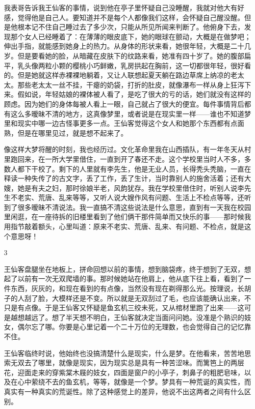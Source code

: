 我表哥告诉我王仙客的事情，说到他在亭子里怀疑自己没睡醒，我就对他大有好感，觉得他是自己人。要知道并不是每个人都像我们这样，会怀疑自己醒没醒。但是他根本记不住自己睡过去了多少次，只能从所见所闻来判断了。他俯身下去，发现那个女人已经睡着了：在薄薄的眼皮底下，她的眼球在颤动，大概是在做梦吧；伸出手指，就能感到她身上的热力。从身体的形状来看，她很年轻，大概是二十几岁。但是要看她的脸，从暗藏在皮肤下的纹路来看，她准有四十岁了。她的腹部扁平，乳头像两粒小颗的樱桃小巧鲜嫩，乳房拱起在胸前，这一切都很年轻，很好看的。但是她就这样赤裸裸地躺着，又让人联想起夏天躺在路边草席上纳凉的老太太。那些老太太一丝不挂，干瘪的奶袋，打折的肚皮，就像瀑布一样从身上狂泻下来。假如说，年轻姑娘的裸体被人看了，是吃了很大的亏的话，她们就没有这样的顾虑。因为她们的身体每被人看上一眼，自己就占了很大的便宜。每件事情背后都有这么多暧昧不清的地方，这真像梦里，或者说是在现实里一样——谁也不知道梦里和现实中哪一边古怪事更多一点。王仙客觉得这个女人和她那个东西都有点面熟，但是在哪里见过，就是想不起来了。 

像这样大梦将醒的时刻，我也经历过。文化革命里我在山西插队，有一年冬天从村里跑回来，在一所大学里借住，一直到开了春还不走。这个学校里当时人不多，多数人都下干校了。剩下的人里就有李先生，他是无业人员，长得秃头秃脑，一直在释读一种失传了的古文字，丢了工作，丢了生计，当时靠别人的施舍活着；还有大嫂，她是有夫之妇，那时徐娘半老，风韵犹存。我在学校里借住时，听别人说李先生不老实、荒唐、乱来等等，又听人说大嫂作风有问题、生活上不检点等等，还听到了很多暧昧不清说法。我一直搞不清这些说法是什么意思，直到有一天我在校园里闲逛，在一座待拆的旧楼里看到了他们俩干那件简单而又快乐的事——那时候我用指节敲着额头，心里叫道：原来不老实、荒唐、乱来、有问题、不检点，就是这个意思呀！ 

3 

王仙客盘腿坐在地板上，拼命回想以前的事情，想到脑袋疼，终于想到了无双，想起了以前有一次无双爬墙的事。那时候她站在他肩上，他从底下往上看，看到了一件东西，灰灰的，和现在看到的有点像，当然没有现在剃得那么光。按理说，长胡子的人刮了脸，大模样还是不变。所以就是无双刮过了毛，也应该能确认出来，不只是有点像。于是王仙客又怀疑是鱼玄机三绞未死，又从棺材里跑了出来——这可是越想越远了。想了半天想不明白，王仙客就决定当面问问她。没准是个熟识的妓女，偶尔忘了哪。你要是心里记着一个二十万位的无理数，也会觉得自己的记忆靠不住。 

王仙客临终时说，他始终也没搞清楚什么是现实，什么是梦。在他看来，苦苦地思索无双去了哪里，就像是现实，因为现实总是具有一种苦涩味。而篱笆上的两层花，迎面走来的穿紫棠木屐的妓女，四面是窗户的小亭子，刺鼻子的粗肥皂味，以及在心中萦绕不去的鱼玄机，等等，就像是一个梦。梦具有一种荒诞的真实性，而真实有一种真实的荒诞性。除了这种感觉上的差异，他说不出这两者之间有什么区别。 

